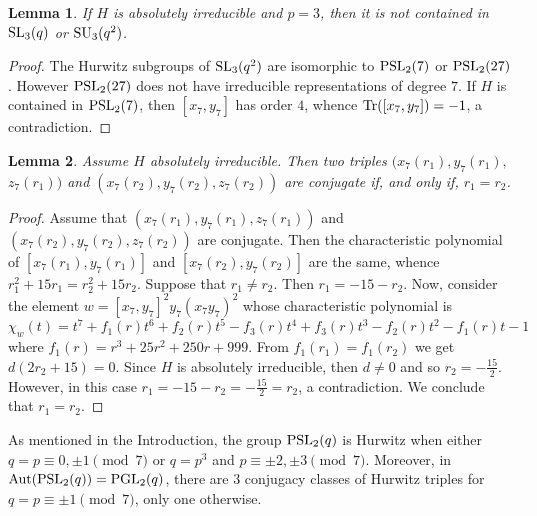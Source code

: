 \documentclass{amsart}
\newtheorem{lemma}{Lemma}[section]
\theoremstyle{remark}
\begin{document}
\begin{lemma}\label{SL3}
If $H$ is absolutely irreducible and $p=3$, then it is not contained in ${\mathop{\rm SL}\nolimits}_3(q)$ or ${\mathop{\rm SU}\nolimits}_3(q^ 2)$.
\end{lemma}

\begin{proof}
The Hurwitz subgroups of ${\mathop{\rm SL}\nolimits}_3(q^ 2)$ are isomorphic to ${\mathop{\rm PSL}\nolimits}_2(7)$ or ${\mathop{\rm PSL}\nolimits}_2(27)$. 
However ${\mathop{\rm PSL}\nolimits}_2(27)$ does not have irreducible representations of degree $7$.
If $H$ is  contained in ${\mathop{\rm PSL}\nolimits}_2(7)$, then $[x_7,y_7]$ has order $4$, whence  
${{\rm Tr}({[x_7,y_7]})}=-1$, a contradiction.
\end{proof}

\begin{lemma}\label{nctriples}
Assume $H$ absolutely irreducible. Then two triples $(x_7(r_1),y_7(r_1),$ $z_7(r_1))$ and $(x_7(r_2),y_7(r_2),z_7(r_2))$ 
are conjugate if, and only if, $r_1=r_2$. 
\end{lemma}

\begin{proof}
Assume that $(x_7(r_1),y_7(r_1),z_7(r_1))$ and $(x_7(r_2),y_7(r_2),z_7(r_2))$ are conjugate. 
Then the characteristic polynomial of $[x_7(r_1),y_7(r_1)]$ and $[x_7(r_2),y_7(r_2)]$ are the same, whence 
$r_1^ 2+15r_1=r_2^ 2+15r_2$. 
Suppose that $r_1\neq r_2$. Then $r_1=-15-r_2$.
Now, consider the element $w=[x_7,y_7]^ 2 y_7 (x_7y_7)^ 2 $ whose characteristic polynomial is
$$\chi_w(t)=t^ 7+f_1(r) t^ 6+f_2(r) t^ 5 - f_3(r)t^ 4 +f_3(r) t^ 3-f_2(r) t^ 2-f_1(r) t -1$$
where $f_1(r)=   r^3+25 r^2+250 r+999$.
From $f_1(r_1)=f_1(r_2)$ we get $d(2r_2+15)=0$. Since $H$ is absolutely irreducible, then
$d\neq 0$ and so
$r_2=-\frac{15}{2}$. However, in this case $r_1=-15-r_2=-\frac{15}{2}=r_2$, a contradiction.
We conclude that $r_1=r_2$.
\end{proof}

As mentioned in the Introduction, the group ${\mathop{\rm PSL}\nolimits}_2(q)$ is Hurwitz when either $q=p\equiv 0,\pm 1 \pmod 7$ or
$q=p^3$ and $p\equiv \pm 2, \pm 3\pmod 7$.
Moreover, in $\textrm{Aut}({\mathop{\rm PSL}\nolimits}_2(q))={\mathop{\rm PGL}\nolimits}_2(q)$, there are $3$ conjugacy classes of Hurwitz triples 
for $q=p\equiv \pm 1 \pmod 7$, only one otherwise.
\end{document}
